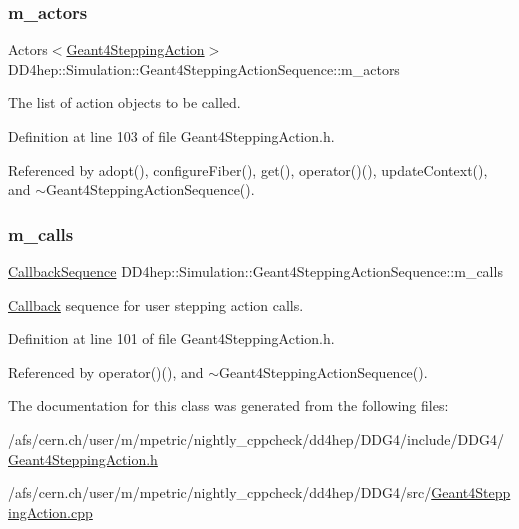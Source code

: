 \subsubsection{\texorpdfstring{m\+\_\+actors}{m\_actors}}
{\footnotesize\ttfamily Actors$<$\hyperlink{class_d_d4hep_1_1_simulation_1_1_geant4_stepping_action}{Geant4\+Stepping\+Action}$>$ D\+D4hep\+::\+Simulation\+::\+Geant4\+Stepping\+Action\+Sequence\+::m\+\_\+actors\hspace{0.3cm}{\ttfamily [protected]}}



The list of action objects to be called. 



Definition at line 103 of file Geant4\+Stepping\+Action.\+h.



Referenced by adopt(), configure\+Fiber(), get(), operator()(), update\+Context(), and $\sim$\+Geant4\+Stepping\+Action\+Sequence().

\hypertarget{class_d_d4hep_1_1_simulation_1_1_geant4_stepping_action_sequence_a336da2773a5c1c830f1b338a32a0aa7e}{}\label{class_d_d4hep_1_1_simulation_1_1_geant4_stepping_action_sequence_a336da2773a5c1c830f1b338a32a0aa7e} 
\subsubsection{\texorpdfstring{m\+\_\+calls}{m\_calls}}
{\footnotesize\ttfamily \hyperlink{struct_d_d4hep_1_1_callback_sequence}{Callback\+Sequence} D\+D4hep\+::\+Simulation\+::\+Geant4\+Stepping\+Action\+Sequence\+::m\+\_\+calls\hspace{0.3cm}{\ttfamily [protected]}}



\hyperlink{class_d_d4hep_1_1_callback}{Callback} sequence for user stepping action calls. 



Definition at line 101 of file Geant4\+Stepping\+Action.\+h.



Referenced by operator()(), and $\sim$\+Geant4\+Stepping\+Action\+Sequence().



The documentation for this class was generated from the following files\+:\begin{DoxyCompactItemize}
\item 
/afs/cern.\+ch/user/m/mpetric/nightly\+\_\+cppcheck/dd4hep/\+D\+D\+G4/include/\+D\+D\+G4/\hyperlink{_geant4_stepping_action_8h}{Geant4\+Stepping\+Action.\+h}\item 
/afs/cern.\+ch/user/m/mpetric/nightly\+\_\+cppcheck/dd4hep/\+D\+D\+G4/src/\hyperlink{_geant4_stepping_action_8cpp}{Geant4\+Stepping\+Action.\+cpp}\end{DoxyCompactItemize}
